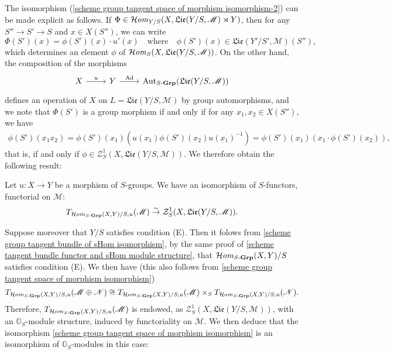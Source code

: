 The isomorphism (\ref{scheme group tangent space of morphism isomorphism-2}) can be made explicit as follows. If $\Phi\in\operatorname{\mathcal{H}\hspace*{-0.4pt}\textit{om}\hspace{0.5pt}}_{Y/S}(X,\mathfrak{Lie}(Y/S,\mathscr{M})\rtimes Y)$, then for any $S''\to S'\to S$ and $x\in X(S'')$, we can write
\[\Phi(S')(x)=\phi(S')(x)\cdot u'(x)\quad\text{where}\quad \phi(S')(x)\in\mathfrak{Lie}(Y'/S',\mathscr{M})(S''),\]
which determines an element $\phi$ of $\operatorname{\mathcal{H}\hspace*{-0.4pt}\textit{om}\hspace{0.5pt}}_S(X,\mathfrak{Lie}(Y/S,\mathscr{M}))$. On the other hand, the composition of the morphisms
\[\begin{tikzcd}
X\ar[r,"u"]&Y\ar[r,"\Ad"]&\Aut_{S\dash\Grp}(\mathfrak{Lie}(Y/S,\mathscr{M}))
\end{tikzcd}\]
defines an operation of $X$ on $L=\mathfrak{Lie}(Y/S,\mathscr{M})$ by group automorphisms, and we note that $\Phi(S')$ is a group morphism if and only if for any $x_1,x_2\in X(S'')$, we have
\begin{align*}
\phi(S')(x_1x_2)=\phi(S')(x_1)(u(x_1)\phi(S')(x_2)u(x_1)^{-1})=\phi(S')(x_1)(x_1\cdot\phi(S')(x_2)),
\end{align*}
that is, if and only if $\phi\in\mathcal{Z}_S^1(X,\mathfrak{Lie}(Y/S,\mathscr{M}))$. We therefore obtain the following result:

\begin{proposition}\label{scheme group tangent space of morphism isomorphism}
Let $u:X\to Y$ be a morphism of $S$-groups. We have an isomorphism of $S$-functors, functorial on $\mathscr{M}$:
\[T_{\operatorname{\mathcal{H}\hspace*{-0.4pt}\textit{om}\hspace{0.5pt}}_{S\textup{-}\mathbf{Grp}}(X,Y)/S,u}(\mathscr{M})\stackrel{\sim}{\to}\mathcal{Z}_S^1(X,\mathfrak{Lie}(Y/S,\mathscr{M})).\]
\end{proposition}

Suppose moreover that $Y/S$ satisfies condition (E). Then it folows from \cref{scheme group tangent bundle of sHom isomorphism}, by the same proof of \cref{scheme tangent bundle functor and sHom module structure}, that $\operatorname{\mathcal{H}\hspace*{-0.4pt}\textit{om}\hspace{0.5pt}}_{S\textup{-}\mathbf{Grp}}(X,Y)/S$ satisfies condition (E). We then have (this also follows from \cref{scheme group tangent space of morphism isomorphism})
\[T_{\operatorname{\mathcal{H}\hspace*{-0.4pt}\textit{om}\hspace{0.5pt}}_{S\textup{-}\mathbf{Grp}}(X,Y)/S,u}(\mathscr{M}\oplus\mathscr{N})\cong T_{\operatorname{\mathcal{H}\hspace*{-0.4pt}\textit{om}\hspace{0.5pt}}_{S\textup{-}\mathbf{Grp}}(X,Y)/S,u}(\mathscr{M})\times_ST_{\operatorname{\mathcal{H}\hspace*{-0.4pt}\textit{om}\hspace{0.5pt}}_{S\textup{-}\mathbf{Grp}}(X,Y)/S,u}(\mathscr{N}).\]
Therefore, $T_{\operatorname{\mathcal{H}\hspace*{-0.4pt}\textit{om}\hspace{0.5pt}}_{S\textup{-}\mathbf{Grp}}(X,Y)/S,u}(\mathscr{M})$ is endowed, as $\mathcal{Z}_S^1(X,\mathfrak{Lie}(Y/S,\mathscr{M}))$, with an $\mathbb{O}_S$-module structure, induced by functoriality on $\mathscr{M}$. We then deduce that the isomorphism \cref{scheme group tangent space of morphism isomorphism} is an isomorphism of $\mathbb{O}_S$-modules in this case:

